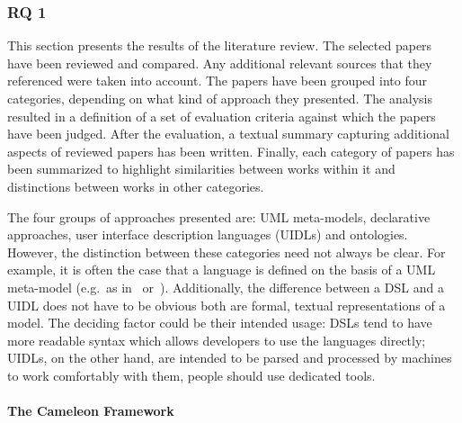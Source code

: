 \subsubsection{RQ 1}\label{subsubsec:rq-1}

This section presents the results of the literature review.
The selected papers have been reviewed and compared.
Any additional relevant sources that they referenced were taken into account.
The papers have been grouped into four categories, depending on what kind of approach they presented.
The analysis resulted in a definition of a set of evaluation criteria against which the papers have been judged.
After the evaluation, a textual summary capturing additional aspects of reviewed papers has been written.
Finally, each category of papers has been summarized to highlight similarities between works within it and distinctions between works in other categories.

The four groups of approaches presented are: UML meta-models, declarative approaches, user interface description languages (UIDLs) and ontologies.
However, the distinction between these categories need not always be clear.
For example, it is often the case that a language is defined on the basis of a UML meta-model (e.g.\ as in~\cite{Karu2013-po} or~\cite{moldovan2020open}).
Additionally, the difference between a DSL and a UIDL does not have to be obvious\,\textemdash\,both are formal, textual representations of a model.
The deciding factor could be their intended usage: DSLs tend to have more readable syntax which allows developers to use the languages directly;
UIDLs, on the other hand, are intended to be parsed and processed by machines\,\textemdash\,to work comfortably with them, people should use dedicated tools.

\paragraph{The Cameleon Framework}


